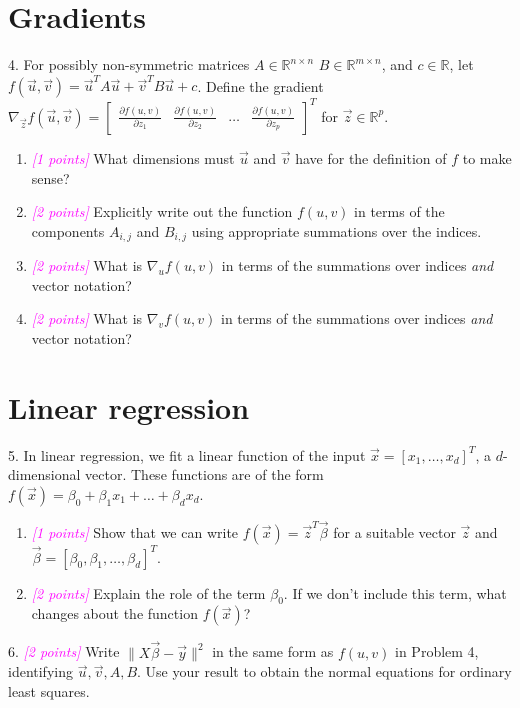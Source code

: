 \documentclass{article}
\newcommand{\R}{\mathbb{R}} %
\newcommand{\points}[1]{\small\textcolor{magenta}{\emph{[#1 points]}} \normalsize}
\begin{document}
\section*{Gradients}
4. For possibly non-symmetric matrices $A \in \R^{n \times n}$
$B \in \R^{m \times n}$,
and $c \in \R$, 
let $f(\vec u, \vec v) = \vec u^T A \vec u + \vec v^T B \vec u + c$. 
Define the gradient 
$\nabla_{\vec z} f(\vec u, \vec v) = 
\begin{bmatrix} \frac{\partial f(u,v)}{\partial z_1} & \frac{\partial f(u,v)}{\partial z_2} & \dots & \frac{\partial f(u,v)}{\partial z_p} \end{bmatrix}^T$ for $\vec z \in \R^p$.
\begin{enumerate}
\item \points{1} What dimensions must $\vec u$ and $\vec v$ have for the definition of $f$ to make sense?
\item \points{2} Explicitly write out the function $f(u, v)$ in terms of the components $A_{i,j}$ and $B_{i,j}$ using appropriate summations over the indices.
\item \points{2} What is $\nabla_u f(u,v)$ in terms of the summations over indices \emph{and} vector notation?
\item \points{2} What is $\nabla_v f(u,v)$ in terms of the summations over indices \emph{and} vector notation?
\end{enumerate}


\section*{Linear regression}
5. In linear regression, we fit a linear function of the input $\vec x = [x_1, \ldots, x_d]^T$, a $d$-dimensional vector. 
These functions are of the form 
$f(\vec x) = \beta_0 + \beta_1 x_1 + \ldots + \beta_d x_d$.
\begin{enumerate}
\item \points{1} Show that we can write $f(\vec x) = \vec z^T \vec \beta$ for a suitable vector $\vec z$ 
  and $\vec \beta = [\beta_0, \beta_1, \ldots, \beta_d]^T$.
\item \points{2} Explain the role of the term $\beta_0$. If we don't include this term, 
  what changes about the function $f(\vec x)$?
\end{enumerate}

6.  \points{2} Write $\| X \vec \beta - \vec y \|^2$ in the same form as $f(u,v)$ in Problem 4,
identifying $\vec u, \vec v, A, B$.
Use your result to obtain the normal equations for ordinary least squares. 
\end{document}
